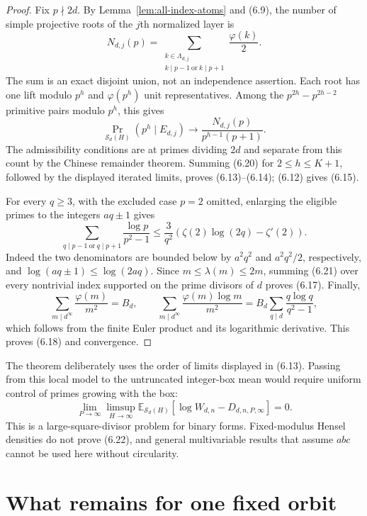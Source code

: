 \documentclass[11pt]{article}
\theoremstyle{definition}
\theoremstyle{remark}
\newcommand{\Sset}{\mathcal S}
\begin{document}
\begin{proof}
Fix \(p\nmid2d\).  By Lemma~\ref{lem:all-index-atoms} and (6.9), the
number of simple projective roots of the $j$th normalized layer is
\[
 N_{d,j}(p)=
 \sum_{\substack{k\in\Lambda_{d,j}\\
 k\mid p-1\ \mathrm{or}\ k\mid p+1}}\frac{\varphi(k)}2.
 \tag{6.19}
\]
The sum is an exact disjoint union, not an independence assertion.  Each
root has one lift modulo $p^h$ and \(\varphi(p^h)\) unit representatives.
Among the \(p^{2h}-p^{2h-2}\) primitive pairs modulo $p^h$, this gives
\[
 \Pr_{\Sset_d(H)}(p^h\mid E_{d,j})
 \longrightarrow
 \frac{N_{d,j}(p)}{p^{h-1}(p+1)}.
 \tag{6.20}
\]
The admissibility conditions are at primes dividing $2d$ and separate
from this count by the Chinese remainder theorem.  Summing (6.20) for
\(2\le h\le K+1\), followed by the displayed iterated limits, proves
(6.13)--(6.14); (6.12) gives (6.15).

For every $q\ge3$, with the excluded case $p=2$ omitted, enlarging the
eligible primes to the integers \(aq\pm1\) gives
\[
 \sum_{q\mid p-1\ \mathrm{or}\ q\mid p+1}
 \frac{\log p}{p^2-1}
 \le\frac3{q^2}
 \left(\zeta(2)\log(2q)-\zeta'(2)\right).
 \tag{6.21}
\]
Indeed the two denominators are bounded below by \(a^2q^2\) and
\(a^2q^2/2\), respectively, and
\(\log(aq\pm1)\le\log(2aq)\).  Since
\(m\le\lambda(m)\le2m\), summing (6.21) over every nontrivial index
supported on the prime divisors of $d$ proves (6.17).  Finally,
\[
 \sum_{m\mid d^\infty}\frac{\varphi(m)}{m^2}=B_d,
 \qquad
 \sum_{m\mid d^\infty}\frac{\varphi(m)\log m}{m^2}
 =B_d\sum_{q\mid d}\frac{q\log q}{q^2-1},
\]
which follows from the finite Euler product and its logarithmic
derivative.  This proves (6.18) and convergence.
\end{proof}

The theorem deliberately uses the order of limits displayed in (6.13).
Passing from this local model to the untruncated integer-box mean would
require uniform control of primes growing with the box:
\[
 \lim_{P\to\infty}\limsup_{H\to\infty}
 \mathbb E_{\Sset_d(H)}
 \left[\log W_{d,n}-D_{d,n,P,\infty}\right]=0.
 \tag{6.22}
\]
This is a large-square-divisor problem for binary forms.  Fixed-modulus
Hensel densities do not prove (6.22), and general multivariable results
that assume $abc$ cannot be used here without circularity.

\section{What remains for one fixed orbit}
\end{document}
